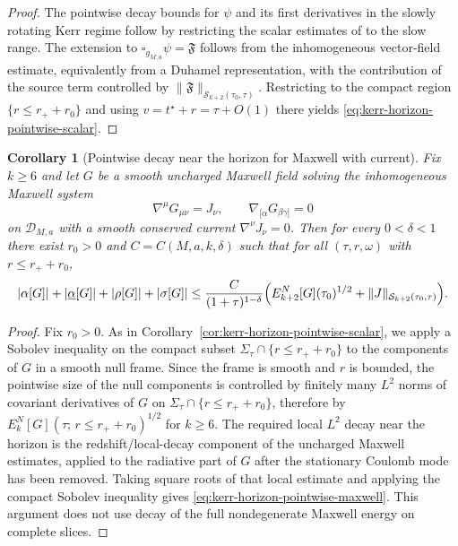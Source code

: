 \documentclass[11pt]{article}
\numberwithin{equation}{section}
\theoremstyle{plain}
\newtheorem{corollary}[theorem]{Corollary}
\theoremstyle{definition}
\theoremstyle{remark}
\begin{document}
\begin{proof}
The pointwise decay bounds for $\psi$ and its first derivatives in the slowly rotating Kerr regime follow by restricting the scalar estimates of \cite[Corollary~3.1]{DRSRKerrIII} to the slow range.
The extension to $\square_{g_{M,a}}\psi=\mathfrak{F}$ follows from the inhomogeneous vector-field estimate, equivalently from a Duhamel representation, with the contribution of the source term controlled by $\|\mathfrak{F}\|_{\mathcal S_{k+2}(\tau_{0},\tau)}$.
Restricting to the compact region $\{r\le r_{+}+r_{0}\}$ and using $v=t^{\star}+r=\tau+O(1)$ there yields \eqref{eq:kerr-horizon-pointwise-scalar}.
\end{proof}

\begin{corollary}[Pointwise decay near the horizon for Maxwell with current]\label{cor:kerr-horizon-pointwise-maxwell}
Fix $k\ge6$ and let $G$ be a smooth uncharged Maxwell field solving the inhomogeneous Maxwell system
\begin{equation}
\nabla^{\mu}G_{\mu\nu}=J_{\nu},\qquad \nabla_{[\alpha}G_{\beta\gamma]}=0
\end{equation}
 on $\mathcal D_{M,a}$ with a smooth conserved current $\nabla^{\nu}J_{\nu}=0$.
Then for every $0<\delta<1$ there exist $r_{0}>0$ and $C=C(M,a,k,\delta)$ such that for all $(\tau,r,\omega)$ with $r\le r_{+}+r_{0}$,
\begin{equation}\label{eq:kerr-horizon-pointwise-maxwell}
|\alpha[G]|+|\underline{\alpha}[G]|+|\rho[G]|+|\sigma[G]|
\le
\frac{C}{(1+\tau)^{1-\delta}}
\Bigl(
E^{N}_{k+2}[G](\tau_{0})^{1/2}
+
\|J\|_{\mathcal S_{k+2}(\tau_{0},\tau)}
\Bigr).
\end{equation}
\end{corollary}

\begin{proof}
Fix $r_{0}>0$.
As in Corollary~\ref{cor:kerr-horizon-pointwise-scalar}, we apply a Sobolev inequality on the compact subset $\Sigma_{\tau}\cap\{r\le r_{+}+r_{0}\}$ to the components of $G$ in a smooth null frame.
Since the frame is smooth and $r$ is bounded, the pointwise size of the null components is controlled by finitely many $L^{2}$ norms of covariant derivatives of $G$ on $\Sigma_{\tau}\cap\{r\le r_{+}+r_{0}\}$, therefore by $E^{N}_{k}[G](\tau;\,r\le r_{+}+r_{0})^{1/2}$ for $k\ge6$.
The required local $L^{2}$ decay near the horizon is the redshift/local-decay component of the uncharged Maxwell estimates, applied to the radiative part of $G$ after the stationary Coulomb mode has been removed. Taking square roots of that local estimate and applying the compact Sobolev inequality gives \eqref{eq:kerr-horizon-pointwise-maxwell}. This argument does not use decay of the full nondegenerate Maxwell energy on complete slices.
\end{proof}
\end{document}
